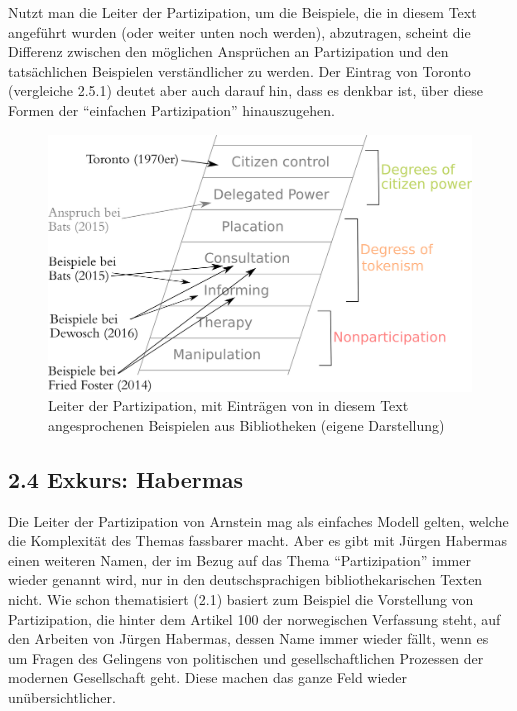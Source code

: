 \documentclass[a4paper,
fontsize=11pt,
oneside,
numbers=noperiodatend,
parskip=half-,
bibliography=totoc,
final
]{scrartcl}
\begin{document}
Nutzt man die Leiter der Partizipation, um die Beispiele, die in diesem
Text angeführt wurden (oder weiter unten noch werden), abzutragen,
scheint die Differenz zwischen den möglichen Ansprüchen an Partizipation
und den tatsächlichen Beispielen verständlicher zu werden. Der Eintrag
von Toronto (vergleiche 2.5.1) deutet aber auch darauf hin, dass es
denkbar ist, über diese Formen der \enquote{einfachen Partizipation}
hinauszugehen.

\begin{figure}
\centering
\includegraphics{img/Ladder-of-Citizen-Participation-mitEintraegen.jpg}
\caption{Leiter der Partizipation, mit Einträgen von in diesem Text
angesprochenen Beispielen aus Bibliotheken (eigene Darstellung)}
\end{figure}

\subsection{2.4 Exkurs: Habermas}\label{exkurs-habermas}

Die Leiter der Partizipation von Arnstein mag als einfaches Modell
gelten, welche die Komplexität des Themas fassbarer macht. Aber es gibt
mit Jürgen Habermas einen weiteren Namen, der im Bezug auf das Thema
\enquote{Partizipation} immer wieder genannt wird, nur in den
deutschsprachigen bibliothekarischen Texten nicht. Wie schon
thematisiert (2.1) basiert zum Beispiel die Vorstellung von
Partizipation, die hinter dem Artikel 100 der norwegischen Verfassung
steht, auf den Arbeiten von Jürgen Habermas, dessen Name immer wieder
fällt, wenn es um Fragen des Gelingens von politischen und
gesellschaftlichen Prozessen der modernen Gesellschaft geht. Diese
machen das ganze Feld wieder unübersichtlicher.
\end{document}
